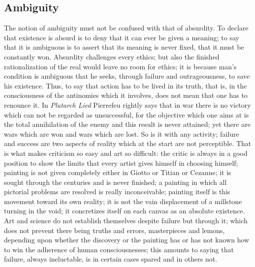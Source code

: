 \documentclass[11pt]{article}
\begin{document}
{{\subsection{Ambiguity}
The notion of ambiguity must not be confused with that of absurdity. To declare that existence is absurd is to deny that it can ever be given a meaning; to say that it is ambiguous is to assert that its meaning is never fixed, that it must be constantly won. Absurdity challenges every ethics; but also the finished rationalization of the real would leave no room for ethics; it is because man’s condition is ambiguous that he seeks, through failure and outrageousness, to save his existence. Thus, to say that action has to be lived in its truth, that is, in the consciousness of the antinomies which it involves, does not mean that one has to renounce it. In \textit{Plutarch Lied} Pierrefeu rightly says that in war there is no victory which can not be regarded as unsuccessful, for the objective which one aims at is the total annihilation of the enemy and this result is never attained; yet there are wars which are won and wars which are lost. So is it with any activity; failure and success are two aspects of reality which at the start are not perceptible. That is what makes criticism so easy and art so difficult: the critic is always in a good position to show the limits that every artist gives himself in choosing himself; painting is not given completely either in Giotto or Titian or Cezanne; it is sought through the centuries and is never finished; a painting in which all pictorial problems are resolved is really inconceivable; painting itself is this movement toward its own reality; it is not the vain displacement of a millstone turning in the void; it concretizes itself on each canvas as an absolute existence. Art and science do not establish themselves despite failure but through it; which does not prevent there being truths and errors, masterpieces and lemons, depending upon whether the discovery or the painting has or has not known how to win the adherence of human consciousnesses; this amounts to saying that failure, always ineluctable, is in certain cases spared and in others not.

}}
\end{document}
